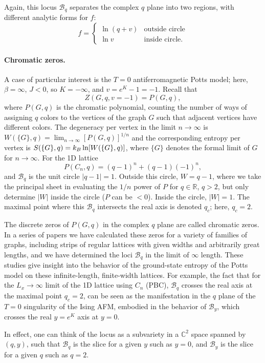 Again, this locus $\mathcal B_q$ separates the complex $q$ plane into two regions, with different analytic forms for
$f$:
\begin{equation}
  f = \begin{cases}\ln(q+v) & \text{outside circle}\\ \ln v & \text{inside circle.}\end{cases}
\end{equation}

\paragraph{Chromatic zeros.} A case of particular interest is the $T = 0$ antiferromagnetic Potts model; here,
$\beta = \infty$, $J<0$, so $K = -\infty$, and $v = e^K-1 = -1$. Recall that
\begin{equation}
  Z(G,q,v=-1) = P(G,q),
\end{equation}
where $P(G,q)$ is the chromatic polynomial, counting the number of ways of assigning $q$ colors to the vertices of
the graph $G$ such that adjacent vertices have different colors. The degeneracy per vertex in the limit $n\to\infty$
is $W(\{G\},q) = \lim_{n\to\infty}[P(G,q)]^{1/n}$ and the corresponding entropy per vertex is
$S(\{G\},q) = k_{B}\ln[W(\{G\},q)]$, where $\{G\}$ denotes the formal limit of $G$ for $n\to\infty$. For the 1D lattice
\begin{equation}
  P(C_n,q) = (q-1)^n + (q-1)(-1)^n,
\end{equation}
and $\mathcal B_q$ is the unit circle $|q-1| = 1$. Outside this circle, $W = q-1$, where we take the principal sheet
in evaluating the $1/n$ power of $P$ for $q\in\mathbb R$, $q>2$, but only determine $|W|$ inside the circle ($P$ can
be $<0$). Inside the circle, $|W| = 1$. The maximal point where this $\mathcal B_q$ intersects the real axis is
denoted $q_c$; here, $q_c = 2$.

The discrete zeros of $P(G,q)$ in the complex $q$ plane are called chromatic zeros. In a series of papers we have
calculated these zeros for a variety of families of graphs, including strips of regular lattices with given widths
and arbitrarily great lengths, and we have determined the loci $\mathcal B_q$ in the limit of $\infty$ length. These
studies give insight into the behavior of the ground-state entropy of the Potts model on these infinite-length,
finite-width lattices. For example, the fact that for the $L_x\to\infty$ limit of the 1D lattice using $C_n$ (PBC),
$\mathcal B_q$ crosses the real axis at the maximal point $q_c = 2$, can be seen as the manifestation in the $q$
plane of the $T = 0$ singularity of the Ising AFM, embodied in the behavior of $\mathcal B_y$, which crosses the real
$y = e^K$ axis at $y = 0$.

In effect, one can think of the locus as a subvariety in a $\mathbb C^2$ space spanned by $(q,y)$, such that
$\mathcal B_q$ is the slice for a given $y$ such as $y = 0$, and $\mathcal B_y$ is the slice for a given $q$ such as
$q = 2$.
